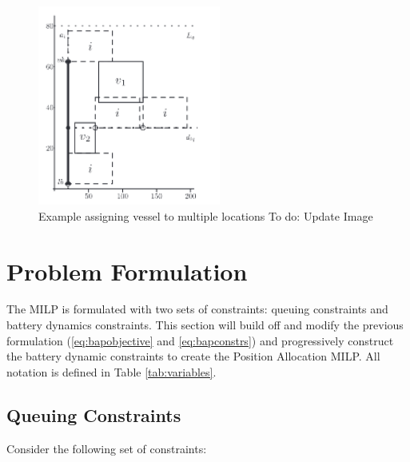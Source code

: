 \documentclass[letterpaper, 10pt, conference]{IEEEtran}
\newcommand{\TODO}[1]{{\color{green} To do: #1}} %
\begin{document}
\begin{figure}
	\centerline{\includegraphics[width=6cm]{multipleassign.png}}
	\caption{Example assigning vessel to multiple locations\TODO{Update Image}}
	\label{fig:multipleassign}
\end{figure}

%
\section{Problem Formulation}
\label{sec:problemformulation}
The MILP is formulated with two sets of constraints: queuing constraints and battery dynamics constraints. This section will build off and modify the previous formulation (\eqref{eq:bapobjective} and \eqref{eq:bapconstrs}) and progressively construct the battery dynamic constraints to create the Position Allocation MILP. All notation is defined in Table \ref{tab:variables}.

\subsection{Queuing Constraints}
\noindent
Consider the following set of constraints:
\end{document}

